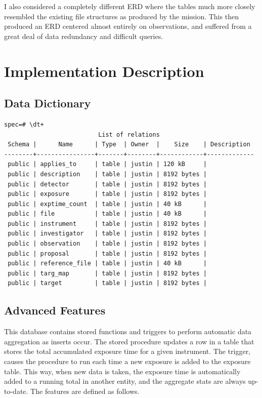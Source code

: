 \documentclass[a4paper,11pt]{article}
\begin{document}
I also considered a completely different ERD where the tables much more closely resembled the existing file structures as produced by the mission.  This then produced an ERD centered almost entirely on observations, and suffered from a great deal of data redundancy and difficult queries. 

\section{Implementation Description}

\subsection{Data Dictionary}
\begin{verbatim}
spec=# \dt+
                          List of relations
 Schema |      Name      | Type  | Owner  |    Size    | Description 
--------+----------------+-------+--------+------------+-------------
 public | applies_to     | table | justin | 120 kB     | 
 public | description    | table | justin | 8192 bytes | 
 public | detector       | table | justin | 8192 bytes | 
 public | exposure       | table | justin | 8192 bytes | 
 public | exptime_count  | table | justin | 40 kB      | 
 public | file           | table | justin | 40 kB      | 
 public | instrument     | table | justin | 8192 bytes | 
 public | investigator   | table | justin | 8192 bytes | 
 public | observation    | table | justin | 8192 bytes | 
 public | proposal       | table | justin | 8192 bytes | 
 public | reference_file | table | justin | 40 kB      | 
 public | targ_map       | table | justin | 8192 bytes | 
 public | target         | table | justin | 8192 bytes | 

\end{verbatim}

\subsection{Advanced Features}
This database contains stored functions and triggers to perform automatic data aggregation as inserts occur.  The stored procedure updates a row in a table that stores the total accumulated exposure time for a given instrument.  The trigger, causes the procedure to run each time a new exposure is added to the exposure table.  This way, when new data is taken, the exposure time is automatically added to a running total in another entity, and the aggregate stats are always up-to-date.  The features are defined as follows.
\end{document}
